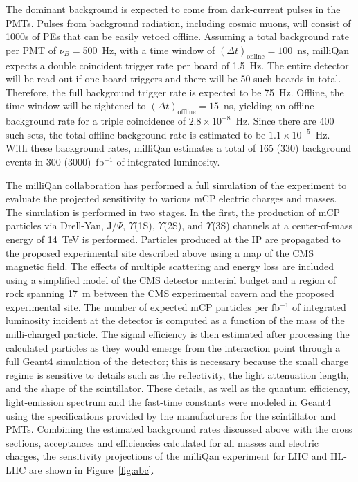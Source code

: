 The dominant background is expected to come from dark-current pulses in the PMTs. Pulses from background radiation, including cosmic muons, will consist of 1000s of PEs that can be easily vetoed offline. Assuming a total background rate per PMT of $\nu_B = $500~Hz, with a time window of $(\Delta t)_{\mathrm{online}} =100$~ns, milliQan expects a double coincident trigger rate per board of 1.5~Hz. The entire detector will be read out if one board triggers and there will be 50 such boards in total. Therefore, the full background trigger rate is expected to be 75~Hz. Offline, the time window will be tightened to $(\Delta t)_{\mathrm{offline}} =15$~ns, yielding an offline background rate for a triple coincidence of $2.8\times10^{-8}$~Hz. Since there are 400 such sets, the total offline background rate is estimated to be $1.1\times10^{-5}$~Hz. With these background rates, milliQan estimates a total of 165 (330) background events in 300 (3000)~fb$^{-1}$ of integrated luminosity. %

The milliQan collaboration has performed a full simulation of the experiment to evaluate the projected sensitivity to various mCP electric charges and masses. The simulation is performed in two stages. In the first, the production of mCP particles via Drell-Yan, J/$\Psi$, $\Upsilon$(1S), $\Upsilon$(2S), and $\Upsilon$(3S) channels at a center-of-mass energy of 14~TeV is performed. Particles produced at the IP are propagated to the proposed experimental site described above using a map of the CMS magnetic field. The effects of multiple scattering and energy loss are included using a simplified model of the CMS detector material budget and a region of rock spanning 17~m between the CMS experimental cavern and the proposed experimental site. The number of expected mCP particles per fb$^{-1}$ of integrated luminosity incident at the detector is computed as a function of the mass of the milli-charged particle. The signal efficiency is then estimated after processing the calculated particles as they would emerge from the interaction point through a full {\sc Geant4} simulation of the detector; this is necessary because the small charge regime is sensitive to details such as the reflectivity, the light attenuation length, and the shape of the scintillator. These details, as well as the quantum efficiency, light-emission spectrum and the fast-time constants were modeled in {\sc Geant4} using the specifications provided by the manufacturers for the scintillator and PMTs. Combining the estimated background rates discussed above with the cross sections, acceptances and efficiencies calculated for all masses and electric charges, the sensitivity projections of the milliQan experiment for LHC and HL-LHC are shown in Figure~\ref{fig:abc}.

